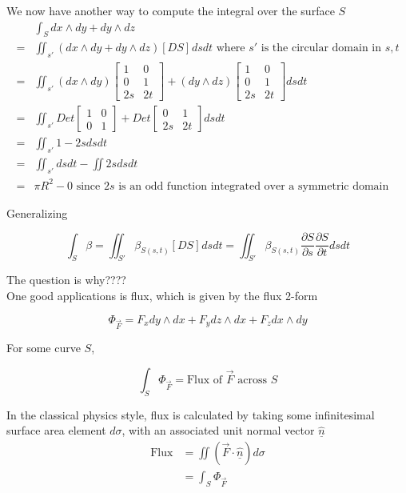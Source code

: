 We now have another way to compute the integral over the surface $S$ 
\begin{align*}
   &\int_{S}^{} dx \wedge dy + dy \wedge dz \\
   =& \iint_{s'} (dx \wedge dy + dy \wedge dz) \left[ D S \right]_{} ds dt  \text{ where $s'$ is the circular domain in $s, t$}\\ 
   =& \iint_{s'}(dx \wedge dy) \begin{bmatrix} 
      1 & 0 \\ 0 & 1 \\ 2s & 2t  
   \end{bmatrix} + (dy \wedge dz) \begin{bmatrix} 
      1 & 0 \\ 0 & 1 \\ 2s & 2t  
   \end{bmatrix} ds dt \\
      =& \iint_{s'} Det \begin{bmatrix} 
         1 & 0 \\ 0 & 1  
      \end{bmatrix} + Det \begin{bmatrix} 
         0 & 1 \\ 2s & 2t  
      \end{bmatrix} ds dt \\
         =& \iint_{s'} 1 - 2s ds dt \\
         =& \iint_{s'} dsdt - \iint 2s ds dt \\
         =& \pi R^2 - 0 \text{ since $2s$ is an odd function integrated over a symmetric domain}
\end{align*}

Generalizing

\[
   \int_{S}^{} \beta = \iint_{S'} \beta_{S(s, t)} \left[ D S \right]_{} ds dt
   = \iint_{S'}  \beta_{S(s, t)} \frac{\partial S}{\partial s} \frac{\partial S}{\partial t} ds dt
\] 

The question is why???? \\

One good applications is flux, which is given by the flux 2-form

\[
   \Phi_{\vec{F}} = F_x dy \wedge dx + F_y dz \wedge dx + F_z dx \wedge dy
\] 

For some curve $S$, 

\[
   \int_{S}^{} \Phi_{\vec{F}} = \text{Flux of $\vec{F}$ across $S$} 
\] 

In the classical physics style, flux is calculated by taking some infinitesimal surface area element $d\sigma$, with an associated unit normal vector  $\hat{ \underline{n}}$
\begin{align*}
   \text{Flux} &= \iint \left( \vec{F} \cdot \hat{ \underline{n}} \right) d \sigma  \\
               &= \int_{S}^{} \Phi_{\vec{F}} 
\end{align*}

